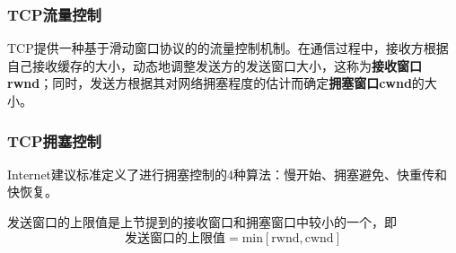 \documentclass[12pt, a4paper, oneside]{ctexart}
\begin{document}
\subsubsection{TCP流量控制}

TCP提供一种基于滑动窗口协议的的流量控制机制。在通信过程中，接收方根据自己接收缓存的大小，动态地调整发送方的发送窗口大小，这称为\textbf{接收窗口rwnd}；同时，发送方根据其对网络拥塞程度的估计而确定\textbf{拥塞窗口cwnd}的大小。

\subsubsection{TCP拥塞控制}

Internet建议标准定义了进行拥塞控制的4种算法：慢开始、拥塞避免、快重传和快恢复。

发送窗口的上限值是上节提到的接收窗口和拥塞窗口中较小的一个，即
\begin{equation*}
    \text{发送窗口的上限值}=\text{min}[\text{rwnd}, \text{cwnd}]
\end{equation*}
\end{document}
